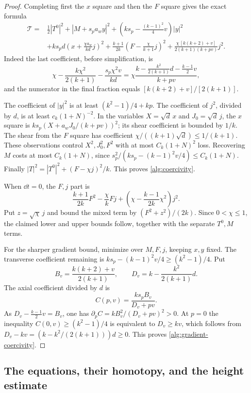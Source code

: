 \begin{proof}
Completing first the $x$ square and then the $F$ square gives the exact
formula
\begin{equation}
\begin{split}
 \mathcal T={}&\tfrac12|T^0|^2+|M+s_pa_wy|^2
 +\left(ks_p-\tfrac{(k-1)^2}{4}v\right)|y|^2\\
 &+ks_pd\left(x+\frac{\chi a_w}{kd}j\right)^2
 +\frac{k+1}{2k}\left(F-\frac{\chi}{k+1}j\right)^2
 +\frac{\chi\,[k(k+2)+v]}{2(k+1)(k+pv)}j^2 .
\end{split}
\label{alg:completed-squares}
\end{equation}
Indeed the last coefficient, before simplification, is
\[
 \chi-\frac{k\chi^2}{2(k+1)}
       -\frac{s_p\chi^2v}{kd}
 =\chi\frac{k-\frac{k^2}{2(k+1)}d-\frac{k-1}{2}v}{k+pv},
\]
and the numerator in the final fraction equals
$[k(k+2)+v]/[2(k+1)]$.

The coefficient of $|y|^2$ is at least $(k^2-1)/4+kp$.
The coefficient of $j^2$, divided by $d$, is at least
$c_k(1+N)^{-2}$.  In the variables $X=\sqrt d\,x$ and
$J_0=\sqrt d\,j$, the $x$ square is
$ks_p(X+a_wJ_0/(k+pv))^2$; its shear coefficient is bounded by $1/k$.
The shear from the $F$ square has coefficient
$\chi/((k+1)\sqrt d)\leq1/(k+1)$.  These observations control
$X^2,J_0^2,F^2$ with at most $C_k(1+N)^2$ loss.  Recovering $M$
costs at most $C_k(1+N)$, since
$s_p^2/(ks_p-(k-1)^2v/4)\leq C_k(1+N)$.
Finally $|T|^2=|T^0|^2+(F-\chi j)^2/k$.  This proves
\eqref{alg:coercivity}.

When $\dd t=0$, the $F,j$ part is
\[
 \frac{k+1}{2k}F^2-\frac{\chi}{k}Fj
     +\left(\chi-\frac{k-1}{2k}\chi^2\right)j^2.
\]
Put $z=\sqrt\chi\,j$ and bound the mixed term by
$(F^2+z^2)/(2k)$.  Since $0<\chi\leq1$, the claimed lower and
upper bounds follow, together with the separate $T^0,M$ terms.

For the sharper gradient bound, minimize over $M,F,j$, keeping $x,y$
fixed.  The transverse coefficient remaining is
$ks_p-(k-1)^2v/4\geq(k^2-1)/4$.  Put
\[
 B_v=\frac{k(k+2)+v}{2(k+1)},\qquad
 D_v=k-\frac{k^2}{2(k+1)}d.
\]
The axial coefficient divided by $d$ is
\[
 C(p,v)=\frac{ks_pB_v}{D_v+pv}.
\]
As $D_v-\frac{k-1}{2}v=B_v$, one has
$\partial_pC=kB_v^2/(D_v+pv)^2>0$.  At $p=0$ the inequality
$C(0,v)\geq(k^2-1)/4$ is equivalent to $D_v\geq kv$, which follows
from $D_v-kv=(k-k^2/(2(k+1)))d\geq0$.  This proves
\eqref{alg:gradient-coercivity}.
\end{proof}

\subsection{The equations, their homotopy, and the height estimate}

